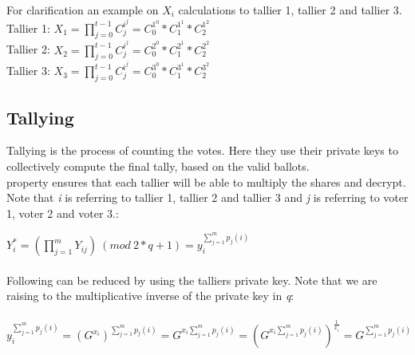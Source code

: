 \noindent
For clarification an example on \begin{math}X_i\end{math} calculations to tallier 1, tallier 2 and tallier 3.\\
Tallier 1: \begin{math}X_1=\prod\limits_{j=0}^{t-1} C_j^{i^j} = C_0^{1^0} * C_1^{1^1} * C_2^{1^2}\end{math}\\
Tallier 2: \begin{math}X_2=\prod\limits_{j=0}^{t-1} C_j^{i^j} = C_0^{2^0} * C_1^{2^1} * C_2^{2^2}\end{math}\\
Tallier 3: \begin{math}X_3=\prod\limits_{j=0}^{t-1} C_j^{i^j} = C_0^{3^0} * C_1^{3^1} * C_2^{3^2}\end{math}



\subsection{Tallying}
Tallying is the process of counting the votes. Here they use their private keys to collectively compute the final tally, based on the valid ballots.\\


\noindent
{} property ensures that each tallier will  be able to multiply the shares and decrypt. Note that \textit{i} is referring to tallier 1, tallier  2 and tallier 3 and \textit{j} is referring to voter 1, voter 2 and voter 3.:\\

\begin{infobox}
\begin{math}Y_i^*=(\prod\limits_{j=1}^{m} Y_{ij}) \ (mod\ 2*q+1) =y_i^{\sum\limits_{j=1}^m p_j(i)}\end{math}\\ \\
Following can be reduced by using the talliers private key. Note that we are raising to the multiplicative inverse of the private key in  \textit{q}:\\\\
\begin{math}y_i^{\sum\limits_{j=1}^m p_j(i)}=(G^{x_i})^{\sum\limits_{j=1}^m p_j(i)} = G^{x_i \sum\limits_{j=1}^m p_j(i)}= (G^{x_i \sum\limits_{j=1}^m p_j(i)})^{\frac{1}{x_i}}= G^{ \sum\limits_{j=1}^m p_j(i)}   \end{math}
\end{infobox}

